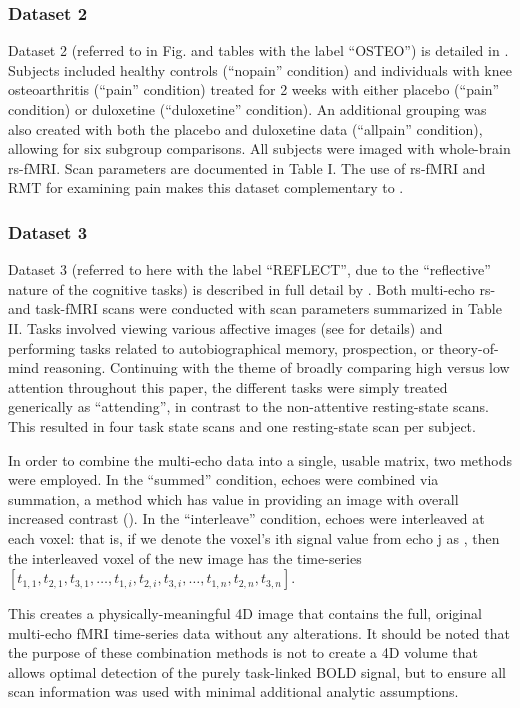 \subsubsection{Dataset 2}
Dataset 2 (referred to in Fig. and tables with the label ``OSTEO'') is detailed in
\cite{tetreaultBrainConnectivityPredicts2016}. Subjects included healthy controls (``nopain''
condition) and individuals with knee osteoarthritis (``pain'' condition) treated for 2 weeks with
either placebo (``pain'' condition) or duloxetine (``duloxetine'' condition). An additional grouping was
also created with both the placebo and duloxetine data (``allpain'' condition), allowing for six
subgroup comparisons. All subjects were imaged with whole-brain rs-fMRI. Scan parameters are
documented in Table I. The use of rs-fMRI and RMT for examining pain makes this dataset
complementary to \cite{matharooSpontaneousBackpainAlters2020}.

\subsubsection{Dataset 3}
Dataset 3  (referred to here with the label ``REFLECT'', due to the ``reflective” nature of the
cognitive tasks) is described in full detail by \cite{dupreMultiechoFMRIReplication2016}. Both
multi-echo rs- and task-fMRI scans were conducted with scan parameters summarized in Table II. Tasks
involved viewing various affective images (see \cite{sprengPatternsBrainActivity2010} for details)
and performing tasks related to autobiographical memory, prospection, or theory-of-mind reasoning.
Continuing with the theme of broadly comparing high versus low attention throughout this paper, the
different tasks were simply treated generically as ``attending'', in contrast to the non-attentive
resting-state scans. This resulted in four task state scans and one resting-state scan per subject.

In order to combine the multi-echo data into a single, usable matrix, two methods were employed. In
the ``summed'' condition, echoes were combined via summation, a method which has value in providing an
image with overall increased contrast (\cite{kunduMultiechoFMRIReview2017}). In the ``interleave''
condition, echoes were interleaved at each voxel: that is, if we denote the voxel's ith signal value
from echo j as , then the interleaved voxel of the new image has the time-series \([t_{1,1},
t_{2,1}, t_{3,1}, \dots, t_{1,i}, t_{2,i}, t_{3,i}, \dots, t_{1,n}, t_{2,n}, t_{3,n}]\).

This creates a physically-meaningful 4D image that contains the full, original multi-echo fMRI
time-series data without any alterations. It should be noted that the purpose of these combination
methods is not to create a 4D volume that allows optimal detection of the purely task-linked BOLD
signal, but to ensure all scan information was used with minimal additional analytic assumptions.

